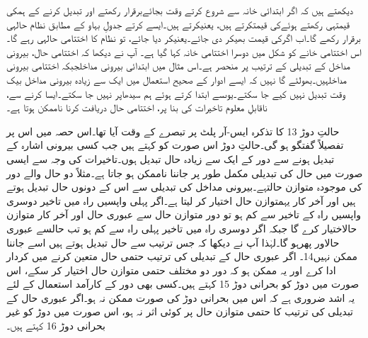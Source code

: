 	دیکھتے ہیں کہ اگر ابتدائی خانہ سے شروع کرتے وقت بجائےبرقرار رکھتے اور تبدیل کرنے کے ہمکی قیمتہی رکھتے ہوئےکی قیمتکرتے ہیں، یعنیکرتے ہیں۔ایسے کرتے جدولِ بہاو کے مطابق نظام حالہی برقرار رکھے گا۔اب اگرکی قیمت بھیکر دی جائے۔یعنیکر دیا جائے، تو نظام کا اختتامی حالہی رہے گا۔اس اختتامی خانے کو شکل میں دوسرا اختتامی خانہ کہا گیا ہے۔
	آپ نے دیکھا کہ اختتامی حال، بیرونی مداخل کے تبدیلی کے ترتیب پر منحصر ہے۔اس مثال میں ابتدائی بیرونی مداخلجبکہ اختتامی بیرونی مداخلہیں۔بھولئے گا نہیں کہ ایسے ادوار کے صحیح استعمال میں ایک سے زیادہ بیرونی مداخل بیک وقت تبدیل نہیں کیے جا سکتے۔یوںسے ابتدا کرتے ہوئے ہم سیدھاپر نہیں جا سکتے۔ایسا کرنے سے، ناقابلِ معلوم تاخیرات کی بنا پر، اختتامی حال دریافت کرنا ناممکن ہوتا ہے۔

	حالتِ دوڑ 13 کا تذکرہ ایس-آر پلٹ پر تبصرے کے وقت آیا تھا۔اس حصہ میں اس پر تفصیلاً گفتگو ہو گی۔حالتِ دوڑ اس صورت کو کہتے ہیں جب کسی بیرونی اشارہ کے تبدیل ہونے سے دور کے ایک سے زیادہ حال تبدیل ہوں۔تاخیرات کی وجہ سے ایسی صورت میں حال  کی تبدیلی مکمل طور پر جاننا ناممکن ہو جاتا ہے۔مثلاً دو حال  والے دور کی موجودہ متوازن حالتہے۔بیرونی مداخل کی تبدیلی  سے اس کے دونوں حال تبدیل ہوتے ہیں اور آخر کار یہمتوازن حال اختیار کر لیتا ہے۔اگر پہلی واپسیں راہ میں تاخیر دوسری واپسیں راہ کے تاخیر سے کم ہو تو دور متوازن حال سے عبوری حال اور آخر کار متوازن حالاختیار کرے گا جبکہ اگر دوسری راہ میں تاخیر پہلی راہ سے کم ہو تب حالسے عبوری حالاور پھرہو گا۔لہٰذا آپ نے دیکھا کہ جس ترتیب سے حال تبدیل ہوتے ہیں اسے جاننا ممکن نہیں14۔
	اگر عبوری حال  کے تبدیلی کی ترتیب حتمی حال متعین کرنے میں کردار ادا کرے اور یہ ممکن ہو کہ دور دو مختلف حتمی متوازن حال اختیار کر سکے، اس صورت میں دوڑ کو بحرانی دوڑ 15 کہتے ہیں۔کسی بھی دور کے کارآمد استعمال کے لئے یہ اشد ضروری ہے کہ اس میں بحرانی دوڑ کی صورت ممکن نہ ہو۔اگر عبوری حال کے تبدیلی کی ترتیب کا حتمی متوازن حال پر کوئی اثر نہ ہو، اس صورت میں دوڑ کو غیر بحرانی دوڑ 16 کہتے ہیں۔



